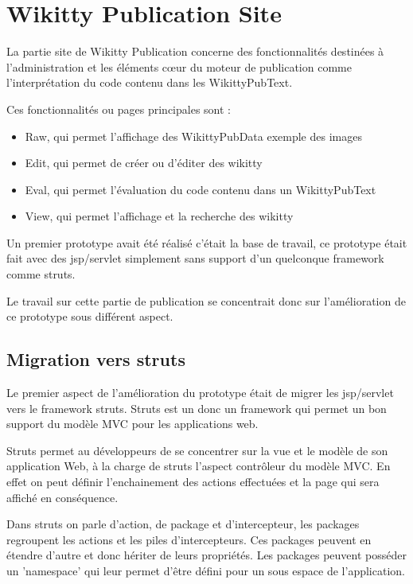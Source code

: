 \section{Wikitty Publication Site}

La partie site de Wikitty Publication concerne des fonctionnalités
destinées à l'administration et les éléments cœur du moteur de publication
comme l'interprétation du code contenu dans les WikittyPubText. 

Ces fonctionnalités ou pages principales sont :
\begin{itemize}
\item Raw, qui permet l'affichage des WikittyPubData exemple des images
\item Edit, qui permet de créer ou d'éditer des wikitty
\item Eval, qui permet l'évaluation du code contenu dans un WikittyPubText
\item View, qui permet l'affichage et la recherche des wikitty
\end{itemize}

Un premier prototype avait été réalisé c'était la base de travail, ce prototype
était fait avec des jsp/servlet simplement sans support d'un quelconque
framework comme struts.

Le travail sur cette partie de publication se concentrait donc sur
l'amélioration de ce prototype sous différent aspect.


\subsection{Migration vers struts}

Le premier aspect de l'amélioration du prototype était de migrer les jsp/servlet
vers le framework struts. Struts est un donc un framework qui permet un bon
support du modèle MVC pour les applications web.

Struts permet au développeurs de se concentrer sur la vue et le modèle de son
application Web, à la charge de struts l'aspect contrôleur du modèle MVC. En
effet on peut définir l'enchainement des actions effectuées et la page qui sera
affiché en conséquence.

Dans struts on parle d'action, de package et d'intercepteur, les packages
regroupent les actions et les piles d'intercepteurs. Ces packages peuvent en
étendre d'autre et donc hériter de leurs propriétés. Les packages peuvent
posséder un 'namespace' qui leur permet d'être défini pour un sous espace de
l'application.

